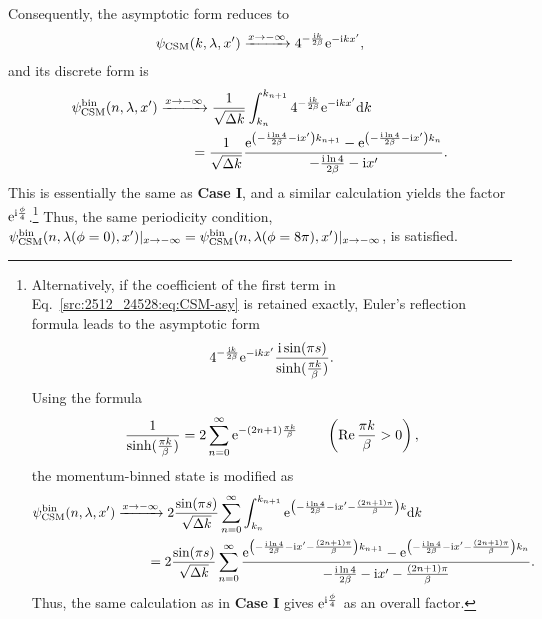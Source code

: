     Consequently, the asymptotic form reduces to 
    \begin{align}
        \psi_{\mathrm{CSM}}(k,\lambda,x')\xrightarrow{x\to-\infty} 4^{-\frac{\mathrm{i} k}{2\beta}} \mathrm{e}^{-\mathrm{i} kx'} ,
    \end{align}
    and its discrete form is 
    \begin{align}
        \psi^{\mathrm{bin}}_{\mathrm{CSM}}(n,\lambda,x') &\xrightarrow{x\to-\infty}
        \frac{1}{\sqrt{\Delta k}}\int_{k_n}^{k_{n+1}} 4^{-\frac{\mathrm{i} k}{2\beta}} \mathrm{e}^{-\mathrm{i} kx'} \mathrm{d} k
        \notag\\
        &\ \qquad = \frac{1}{\sqrt{\Delta k}} \frac{\mathrm{e}^{\left(-\frac{\mathrm{i} \ln{4}}{2\beta}-\mathrm{i} x'\right)k_{n+1}}-\mathrm{e}^{\left(-\frac{\mathrm{i} \ln{4}}{2\beta}-\mathrm{i} x'\right)k_{n}}}{-\frac{\mathrm{i} \ln{4}}{2\beta}-\mathrm{i} x'} .
    \end{align}
    This is essentially the same as \textbf{Case I}, and a similar calculation yields the factor $\mathrm{e}^{\mathrm{i} \frac{\phi}{4}}$.\footnote{Alternatively, if the coefficient of the first term in Eq.~\eqref{src:2512_24528:eq:CSM-asy} is retained exactly, Euler’s reflection formula leads to the asymptotic form
    \begin{align}
        4^{-\frac{\mathrm{i} k}{2\beta}} \mathrm{e}^{-\mathrm{i} kx'} \frac{\mathrm{i} \sin(\pi s)}{\sinh(\frac{\pi k}{\beta})} .
    \end{align}
    Using the formula
    \begin{align}
        \frac{1}{\sinh(\frac{\pi k}{\beta})} = 2 \sum_{n=0}^{\infty} \mathrm{e}^{-(2n+1)\frac{\pi k}{\beta}} \qquad \left(\operatorname{Re} \frac{\pi k}{\beta} >0\right) ,
    \end{align}
    the momentum-binned state is modified as
    \begin{align}
        \psi^{\mathrm{bin}}_{\mathrm{CSM}}(n,\lambda,x') &\xrightarrow{x\to-\infty} 2\frac{\sin(\pi s)}{\sqrt{\Delta k}} \sum_{n=0}^{\infty} \int_{k_n}^{k_{n+1}} \mathrm{e}^{\left(-\frac{\mathrm{i} \ln{4}}{2\beta}-\mathrm{i} x'-\frac{(2n+1)\pi}{\beta}\right)k}\mathrm{d} k
        \notag\\
        &\ \qquad = 2\frac{\sin(\pi s)}{\sqrt{\Delta k}} \sum_{n=0}^{\infty} \frac{\mathrm{e}^{\left(-\frac{\mathrm{i} \ln{4}}{2\beta}-\mathrm{i} x'-\frac{(2n+1)\pi}{\beta}\right)k_{n+1}}-\mathrm{e}^{\left(-\frac{\mathrm{i} \ln{4}}{2\beta}-\mathrm{i} x'-\frac{(2n+1)\pi}{\beta}\right)k_{n}}}{-\frac{\mathrm{i} \ln{4}}{2\beta}-\mathrm{i} x'-\frac{(2n+1)\pi}{\beta}} .
    \end{align}
    Thus, the same calculation as in \textbf{Case I} gives $\mathrm{e}^{\mathrm{i} \frac{\phi}{4}}$ as an overall factor.}
    Thus, the same periodicity condition, $\psi^{\mathrm{bin}}_{\mathrm{CSM}}(n,\lambda(\phi=0),x')|_{x\to-\infty}=\psi^{\mathrm{bin}}_{\mathrm{CSM}}(n,\lambda(\phi=8\pi),x')|_{x\to-\infty}$, is satisfied.

